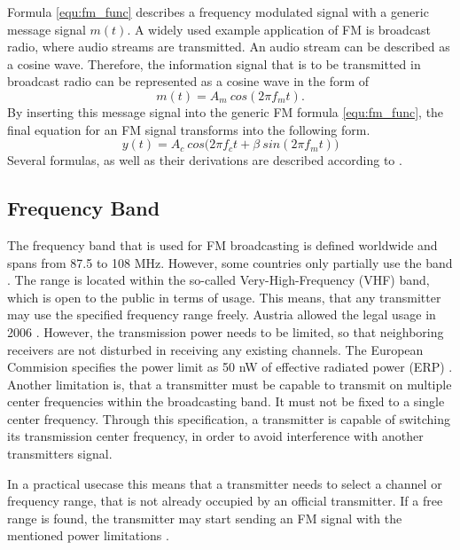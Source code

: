 Formula \eqref{equ:fm_func} describes a frequency modulated signal with a generic message signal $m(t)$.
A widely used example application of FM is broadcast radio, where audio streams are transmitted.
An audio stream can be described as a cosine wave.
Therefore, the information signal that is to be transmitted in broadcast radio can be represented as a cosine wave in the form of
\begin{equation}
  m(t) = A_m\ cos(2 \pi f_m t).
\end{equation}
By inserting this message signal into the generic FM formula \eqref{equ:fm_func}, the final equation for an FM signal transforms into the following form.
\begin{equation}
  y(t) = A_c\ cos \Big(2 \pi f_c t + \beta\ sin(2 \pi f_m t)\Big )
\end{equation}
Several formulas, as well as their derivations are described according to \cite{ref_FM_Maths_Info_1}\cite{ref_FMMaths2}.

\subsection{Frequency Band}

The frequency band that is used for FM broadcasting is defined worldwide and spans from 87.5 to 108 MHz.
However, some countries only partially use the band \cite{ref_itu_regulations}.
The range is located within the so-called Very-High-Frequency (VHF) band, which is open to the public in terms of usage.
This means, that any transmitter may use the specified frequency range freely.
Austria allowed the legal usage in 2006 \cite{ref_austria_rundfunkgesetz_2006}.
However, the transmission power needs to be limited, so that neighboring receivers are not disturbed in receiving any existing channels.
The European Commision specifies the power limit as 50 nW of effective radiated power (ERP) \cite{ref_eu_commision_radio_spectrum}.
Another limitation is, that a transmitter must be capable to transmit on multiple center frequencies within the broadcasting band.
It must not be fixed to a single center frequency.
Through this specification, a transmitter is capable of switching its transmission center frequency, in order to avoid interference with another transmitters signal.

In a practical usecase this means that a transmitter needs to select a channel or frequency range, that is not already occupied by an official transmitter.
If a free range is found, the transmitter may start sending an FM signal with the mentioned power limitations \cite{ref_ebu_fm_modulators_in_europe_power_regulations}.

